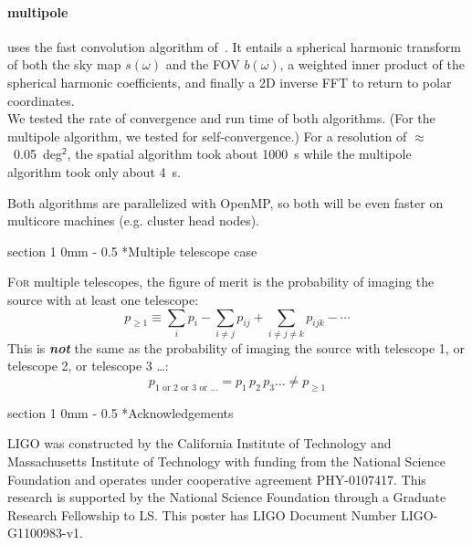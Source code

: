 \documentclass[portrait]{a0poster}
\makeatletter
\newcommand{\dropcap}[2]{\lettrine{\fontspec{Copse}#1}{\textnormal{#2}}}
\renewcommand{\section}{\@startsection
{section}%
{1}%
{0mm}%
{-\baselineskip}%
{0.5\baselineskip}%
{\fontspec{Marvel Bold}\Huge}} %
\renewcommand{\emph}[1]{{\bfseries\itshape#1}}
\makeatother
\begin{document}
\paragraph{multipole} uses the fast convolution algorithm of~\citet{Wandelt:2001p13439}.  It entails a spherical harmonic transform of both the sky map $s(\omega)$ and the FOV $b(\omega)$, a weighted inner product of the spherical harmonic coefficients, and finally a 2D inverse FFT to return to polar coordinates.\\

We tested the rate of convergence and run time of both algorithms.  (For the multipole algorithm, we tested for self-convergence.)  For a resolution of $\approx$~0.05~deg$^\mathsf{2}$, the spatial algorithm took about 1000~s while the multipole algorithm took only about 4~s.

Both algorithms are parallelized with OpenMP, so both will be even faster on multicore machines (e.g. cluster head nodes).

\section*{Multiple telescope case}

\dropcap{F}{or} multiple telescopes, the figure of merit is the probability of imaging the source with at least one telescope:
$$
	p_{\geqslant 1} \equiv \sum_i p_i - \sum_{i \neq j} p_{ij} + \sum_{i \neq j \neq k} p_{ijk} - \cdots
$$
This is \emph{not} the same as the probability of imaging the source with telescope 1, or telescope 2, or telescope 3 \dots :
$$
	p_{1 \textrm{ or } 2 \textrm{ or } 3 \textrm{ or } \dots} = p_1 \, p_2 \, p_3 \dots \neq p_{\geqslant 1}
$$




\section*{Acknowledgements}

LIGO was constructed by the California Institute of Technology and Massachusetts Institute of Technology with funding from the National Science Foundation and operates under cooperative agreement PHY-0107417.  This research is supported by the National Science Foundation through a Graduate Research Fellowship to LS.  This poster has LIGO Document Number LIGO-G1100983-v1.
\end{document}
